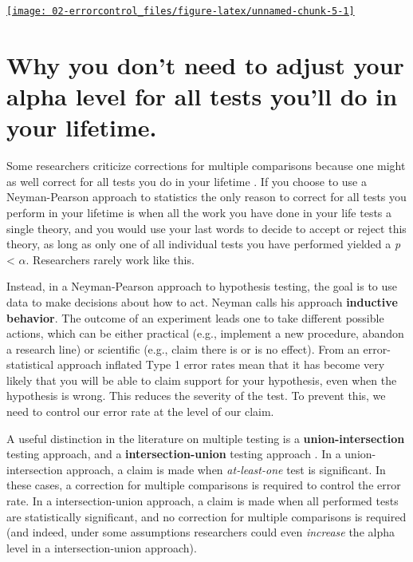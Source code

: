 \documentclass[
  oneside]{book}
\begin{document}
\begin{center}\href{https://shiny.ieis.tue.nl/JustifyAlpha/}{\texttt{[image: 02-errorcontrol\_files/figure-latex/unnamed-chunk-5-1]} }\end{center}

\hypertarget{why-you-dont-need-to-adjust-your-alpha-level-for-all-tests-youll-do-in-your-lifetime.}{%
\section{Why you don't need to adjust your alpha level for all tests you'll do in your lifetime.}\label{why-you-dont-need-to-adjust-your-alpha-level-for-all-tests-youll-do-in-your-lifetime.}}

Some researchers criticize corrections for multiple comparisons because one might as well correct for all tests you do in your lifetime \citep{perneger_whats_1998}. If you choose to use a Neyman-Pearson approach to statistics the only reason to correct for all tests you perform in your lifetime is when all the work you have done in your life tests a single theory, and you would use your last words to decide to accept or reject this theory, as long as only one of all individual tests you have performed yielded a \emph{p} \textless{} \(\alpha\). Researchers rarely work like this.

Instead, in a Neyman-Pearson approach to hypothesis testing, the goal is to use data to make decisions about how to act. Neyman \citeyearpar{neyman_inductive_1957} calls his approach \textbf{inductive behavior}. The outcome of an experiment leads one to take different possible actions, which can be either practical (e.g., implement a new procedure, abandon a research line) or scientific (e.g., claim there is or is no effect). From an error-statistical approach \citep{mayo_statistical_2018} inflated Type 1 error rates mean that it has become very likely that you will be able to claim support for your hypothesis, even when the hypothesis is wrong. This reduces the severity of the test. To prevent this, we need to control our error rate at the level of our claim.

A useful distinction in the literature on multiple testing is a \textbf{union-intersection} testing approach, and a \textbf{intersection-union} testing approach \citep{dmitrienko_traditional_2013}. In a union-intersection approach, a claim is made when \emph{at-least-one} test is significant. In these cases, a correction for multiple comparisons is required to control the error rate. In a intersection-union approach, a claim is made when all performed tests are statistically significant, and no correction for multiple comparisons is required (and indeed, under some assumptions researchers could even \emph{increase} the alpha level in a intersection-union approach).
\end{document}
